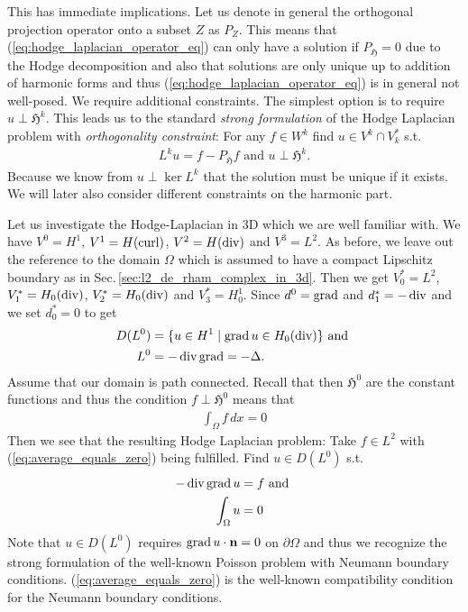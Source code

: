 \documentclass[../master_thesis.tex]{subfiles}
\begin{document}
This has immediate implications. 
Let us denote in general the orthogonal projection operator onto a subset 
$Z$ as $P_Z$.
This means that (\ref{eq:hodge_laplacian_operator_eq})
can only have a solution if $P_\mathfrak{H} = 0$ due to the Hodge decomposition 
and also that solutions are only unique up to addition of harmonic forms and 
thus (\ref{eq:hodge_laplacian_operator_eq}) is in general not well-posed. 
We require additional constraints. The simplest option is to require 
$u \perp \mathfrak{H}^k$. This leads us to the standard 
\textit{strong formulation} of the Hodge Laplacian problem with 
\textit{orthogonality constraint}: For any 
$f \in W^k$ find $u \in V^k \cap V^*_k$ s.t.
\begin{align*}
    L^k u = f - P_\mathfrak{H} f \text{ and } u \perp \mathfrak{H}^k.
\end{align*}
Because we know from $u \perp \ker L^k$ that the solution must be unique if it 
exists. We will later also consider different constraints on the harmonic part.

Let us investigate the Hodge-Laplacian in 3D which we are well familiar with.
We have $V^0 = H^1$, $V^1 = H(\operatorname{curl})$, $V^2 = H(\operatorname{div})$ and $V^3 = L^2$. As before, 
we leave out the reference to the domain $\Omega$ which is assumed to have 
a compact Lipschitz boundary as in Sec.\,\ref{sec:l2_de_rham_complex_in_3d}.
Then we get $V^*_0 = L^2$, $V^*_1 = H_0(\operatorname{div})$, $V^*_2 = H_0(\operatorname{div})$
and $V^*_3 = H^1_0$. Since $d^0 = \operatorname{grad}$ and $d^*_1 = -\operatorname{div}$ and we set 
$d^*_0 = 0$ to get 
\begin{align*}
    D(L^0) &= \{ u \in H^1 \mid \operatorname{grad} u \in H_0(\operatorname{div}) \} \text{ and }
    \\ L^0 &= -\operatorname{div} \operatorname{grad} = - \Delta.
\end{align*}
Assume that our domain is path connected. Recall that then 
$\mathfrak{H}^0$ are the constant functions and thus the 
condition $f \perp \mathfrak{H}^0$ means that 
\begin{align}
    \int_\Omega f \, dx = 0 \label{eq:average_equals_zero}
\end{align}
Then we see that the resulting Hodge Laplacian problem: Take $f \in L^2$ with (\ref{eq:average_equals_zero}) 
being fulfilled. 
Find $u \in D(L^0)$ 
s.t.
\begin{align*}
    -\operatorname{div} \operatorname{grad} u &= f \text{ and }
    \\ \int_\Omega u &= 0
\end{align*}
Note that $u \in D(L^0)$ requires $\operatorname{grad} u \cdot \mathbf{n} = 0$ on $\partial \Omega$ and 
thus we recognize the strong formulation of the well-known Poisson problem with 
Neumann boundary conditions. (\ref{eq:average_equals_zero}) is the well-known 
compatibility condition for the Neumann boundary conditions.
\end{document}
